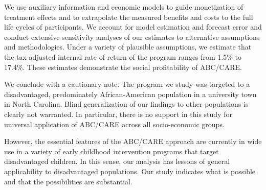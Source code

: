We use auxiliary information and economic models to guide monetization of treatment effects and to extrapolate the measured benefits and costs to the full life cycles of participants. We account for model estimation and forecast error and conduct extensive sensitivity analyses of our estimates to alternative assumptions and methodologies. Under a variety of plausible assumptions, we estimate that the tax-adjusted internal rate of return of the program ranges from 1.5\% to 17.4\%. These estimates demonstrate the social profitability of ABC/CARE.

We conclude with a cautionary note. The program we study was targeted to a disadvantaged, predominately African-American population in a university town in North Carolina. Blind generalization of our findings to other populations is clearly not warranted. In particular, there is no support in this study for universal application of ABC/CARE across all socio-economic groups.

However, the essential features of the ABC/CARE approach are currently in wide use in a variety of early childhood intervention programs that target disadvantaged children. In this sense, our analysis has lessons of general applicability to disadvantaged populations. Our study indicates what is possible and that the possibilities are substantial.

\singlespace





